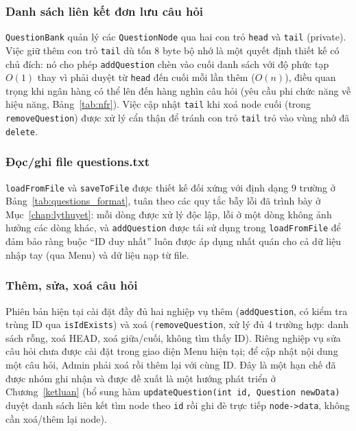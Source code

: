 \documentclass[11pt]{report}
\begin{document}
\subsubsection{Danh sách liên kết đơn lưu câu hỏi}

\texttt{QuestionBank} quản lý các \texttt{QuestionNode} qua hai con trỏ \texttt{head} và \texttt{tail} (private). Việc giữ thêm con trỏ \texttt{tail} dù tốn 8 byte bộ nhớ là một quyết định thiết kế có chủ đích: nó cho phép \texttt{addQuestion} chèn vào cuối danh sách với độ phức tạp $O(1)$ thay vì phải duyệt từ \texttt{head} đến cuối mỗi lần thêm ($O(n)$), điều quan trọng khi ngân hàng có thể lên đến hàng nghìn câu hỏi (yêu cầu phi chức năng về hiệu năng, Bảng~\ref{tab:nfr}). Việc cập nhật \texttt{tail} khi xoá node cuối (trong \texttt{removeQuestion}) được xử lý cẩn thận để tránh con trỏ \texttt{tail} trỏ vào vùng nhớ đã \texttt{delete}.

\subsubsection{Đọc/ghi file questions.txt}

\texttt{loadFromFile} và \texttt{saveToFile} được thiết kế đối xứng với định dạng 9 trường ở Bảng~\ref{tab:questions_format}, tuân theo các quy tắc bẫy lỗi đã trình bày ở Mục~\ref{chap:lythuyet}: mỗi dòng được xử lý độc lập, lỗi ở một dòng không ảnh hưởng các dòng khác, và \texttt{addQuestion} được tái sử dụng trong \texttt{loadFromFile} để đảm bảo ràng buộc ``ID duy nhất'' luôn được áp dụng nhất quán cho cả dữ liệu nhập tay (qua Menu) và dữ liệu nạp từ file.

\subsubsection{Thêm, sửa, xoá câu hỏi}

Phiên bản hiện tại cài đặt đầy đủ hai nghiệp vụ thêm (\texttt{addQuestion}, có kiểm tra trùng ID qua \texttt{isIdExists}) và xoá (\texttt{removeQuestion}, xử lý đủ 4 trường hợp: danh sách rỗng, xoá HEAD, xoá giữa/cuối, không tìm thấy ID). Riêng nghiệp vụ sửa câu hỏi chưa được cài đặt trong giao diện Menu hiện tại; để cập nhật nội dung một câu hỏi, Admin phải xoá rồi thêm lại với cùng ID. Đây là một hạn chế đã được nhóm ghi nhận và được đề xuất là một hướng phát triển ở Chương~\ref{ketluan} (bổ sung hàm \texttt{updateQuestion(int id, Question newData)} duyệt danh sách liên kết tìm node theo \texttt{id} rồi ghi đè trực tiếp \texttt{node->data}, không cần xoá/thêm lại node).
\end{document}
